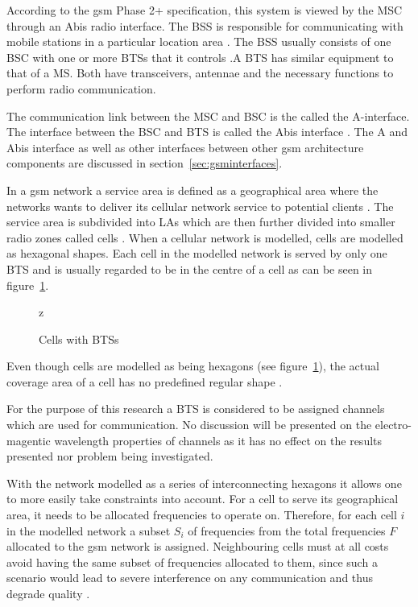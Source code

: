 According to the \gls{gsm} Phase 2+ specification, this system is viewed by the \gls{MSC} through an Abis radio interface. The \gls{BSS} is responsible for communicating with mobile stations in a particular location area \cite{Eisenblatter}. The \gls{BSS} usually consists of one \gls{BSC} with one or more \glspl{BTS} that it controls \cite{Eisenblatter}.A \gls{BTS} has similar equipment to that of a MS\cite{GSMSysEngin}. Both have transceivers, antennae and the necessary functions to perform radio communication.

The communication link between the \gls{MSC} and \gls{BSC} is the called the A-interface. The interface between the \gls{BSC} and \gls{BTS} is called the Abis interface \cite{Eisenblatter}. The A and Abis interface as well as other interfaces between other \gls{gsm} architecture components are discussed in section~\ref{sec:gsminterfaces}.  

In a \gls{gsm} network a service area is defined as a geographical area where the networks wants to deliver its cellular network service to potential clients \cite{GSMArchitectureProtocolsServices, Karen2004}. The service area is subdivided into \glspl{LA} which are then further divided into smaller radio zones called cells \cite{GSMSecurInTeleNetwork}. When a cellular network is modelled, cells are modelled as hexagonal shapes. Each cell in the modelled network is served by only one \gls{BTS} and is usually regarded to be in the centre of a cell as can be seen in figure~\ref{fig:GSMCell}\cite{GSMArchitectureProtocolsServices}. 
\begin{figure}[H]
	\begin{centering}
		
		\caption{Cells with BTSs}
		\label{fig:GSMCell}
	\end{centering}z
\end{figure}
Even though cells are modelled as being hexagons (see figure~\ref{fig:GSMCell}), the actual coverage area of a cell has no predefined regular shape \cite{GSMArchitectureProtocolsServices}.

For the purpose of this research a \gls{BTS} is considered to be assigned channels which are used for communication. No discussion will be presented on the electro-magentic wavelength properties of channels as it has no effect on the results presented nor problem being investigated.

With the network modelled as a series of interconnecting hexagons it allows one to more easily take constraints into account\cite{Eisenblatter}. For a cell to serve its geographical area, it needs to be allocated frequencies to operate on. Therefore, for each cell $i$ in the modelled network a subset $S_i$ of frequencies from the total frequencies $F$ allocated to the \gls{gsm} network is assigned\cite{GSMArchitectureProtocolsServices}. Neighbouring cells must at all costs avoid having the same subset of frequencies allocated to them, since such a scenario would lead to severe interference on any communication and thus degrade quality \cite{GSMArchitectureProtocolsServices}.

